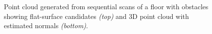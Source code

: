 			\begin{figure}[!h]
				\centering
				\caption{Point cloud generated from sequential scans of a floor with obstacles showing flat-surface candidates \emph{(top)} and 3D point cloud with estimated normals \emph{(bottom)}.}
				\label{fig::surface_estimation2}
			\end{figure}
